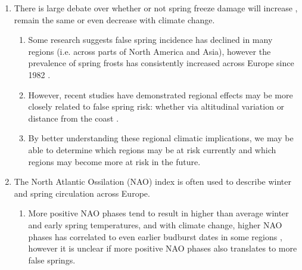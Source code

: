 \documentclass{article}\usepackage[]{graphicx}\usepackage[]{color}
\begin{document}
\begin{enumerate}



\item There is large debate over whether or not spring freeze damage will increase \citep{Hannenin1991, Augspurger2013, Labe2016}, remain the same \citep{Scheifinger2003} or even decrease \citep{Kramer1994} with climate change.
\begin{enumerate}
\item Some research suggests false spring incidence has declined in many regions (i.e. across parts of North America and Asia), however the prevalence of spring frosts has consistently increased across Europe since 1982 \citep{Liu2018}.
\item However, recent studies have demonstrated regional effects may be more closely related to false spring risk: whether via altitudinal variation \citep{Vitra2017} or distance from the coast \citep{Wypych2016a}.
\item By better understanding these regional climatic implications, we may be able to determine which regions may be at risk currently and which regions may become more at risk in the future.
\end{enumerate}

\item The North Atlantic Ossilation (NAO) index is often used to describe winter and spring circulation across Europe.
\begin{enumerate}
\item More positive NAO phases tend to result in higher than average winter and early spring temperatures, and with climate change, higher NAO phases has correlated to even earlier budburst dates in some regions \citep{Chmielewski2001}, however it is unclear if more positive NAO phases also translates to more false springs.
\end{enumerate}


\end{enumerate}
\end{document}
